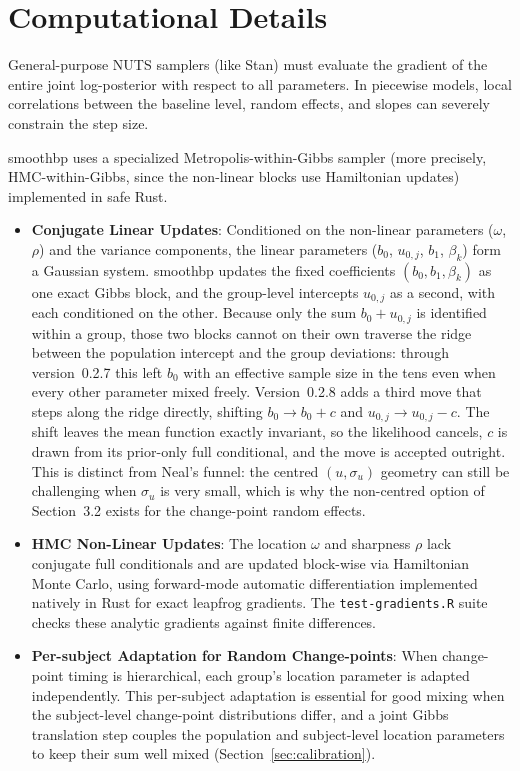 \documentclass[12pt]{article}
\newcommand{\pkg}[1]{\textsf{#1}}
\newcommand{\code}[1]{\texttt{#1}}
\begin{document}
\section{Computational Details}

General-purpose NUTS samplers (like Stan) must evaluate the gradient of the entire joint log-posterior with respect to all parameters. In piecewise models, local correlations between the baseline level, random effects, and slopes can severely constrain the step size.

\pkg{smoothbp} uses a specialized Metropolis-within-Gibbs sampler (more precisely, HMC-within-Gibbs, since the non-linear blocks use Hamiltonian updates) implemented in safe Rust.
\begin{itemize}
    \item \textbf{Conjugate Linear Updates}: Conditioned on the non-linear parameters ($\omega$, $\rho$) and the variance components, the linear parameters ($b_0$, $u_{0,j}$, $b_1$, $\beta_{k}$) form a Gaussian system. \pkg{smoothbp} updates the fixed coefficients $(b_0, b_1, \beta_k)$ as one exact Gibbs block, and the group-level intercepts $u_{0,j}$ as a second, with each conditioned on the other. Because only the sum $b_0 + u_{0,j}$ is identified within a group, those two blocks cannot on their own traverse the ridge between the population intercept and the group deviations: through version~0.2.7 this left $b_0$ with an effective sample size in the tens even when every other parameter mixed freely. Version~0.2.8 adds a third move that steps along the ridge directly, shifting $b_0 \to b_0 + c$ and $u_{0,j} \to u_{0,j} - c$. The shift leaves the mean function exactly invariant, so the likelihood cancels, $c$ is drawn from its prior-only full conditional, and the move is accepted outright. This is distinct from Neal's funnel: the centred $(u, \sigma_u)$ geometry can still be challenging when $\sigma_u$ is very small, which is why the non-centred option of Section~3.2 exists for the change-point random effects.
    \item \textbf{HMC Non-Linear Updates}: The location $\omega$ and sharpness $\rho$ lack conjugate full conditionals and are updated block-wise via Hamiltonian Monte Carlo, using forward-mode automatic differentiation implemented natively in Rust for exact leapfrog gradients. The \code{test-gradients.R} suite checks these analytic gradients against finite differences.
    \item \textbf{Per-subject Adaptation for Random Change-points}: When change-point timing is hierarchical, each group's location parameter is adapted independently. This per-subject adaptation is essential for good mixing when the subject-level change-point distributions differ, and a joint Gibbs translation step couples the population and subject-level location parameters to keep their sum well mixed (Section~\ref{sec:calibration}).

\end{itemize}
\end{document}
